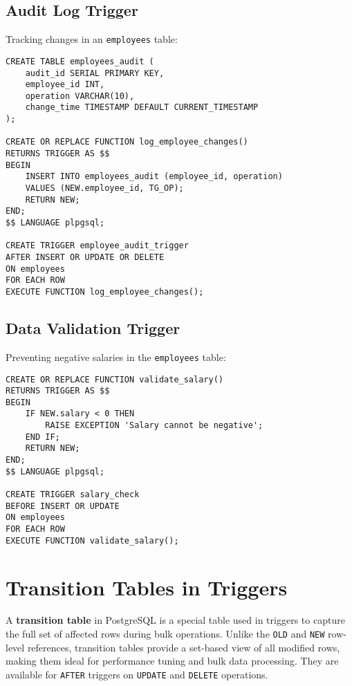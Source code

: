 \documentclass{article}
\begin{document}
\subsection*{Audit Log Trigger}
Tracking changes in an \texttt{employees} table:

\begin{verbatim}
CREATE TABLE employees_audit (
    audit_id SERIAL PRIMARY KEY,
    employee_id INT,
    operation VARCHAR(10),
    change_time TIMESTAMP DEFAULT CURRENT_TIMESTAMP
);

CREATE OR REPLACE FUNCTION log_employee_changes()
RETURNS TRIGGER AS $$
BEGIN
    INSERT INTO employees_audit (employee_id, operation)
    VALUES (NEW.employee_id, TG_OP);
    RETURN NEW;
END;
$$ LANGUAGE plpgsql;

CREATE TRIGGER employee_audit_trigger
AFTER INSERT OR UPDATE OR DELETE
ON employees
FOR EACH ROW
EXECUTE FUNCTION log_employee_changes();
\end{verbatim}

\subsection*{Data Validation Trigger}
Preventing negative salaries in the \texttt{employees} table:

\begin{verbatim}
CREATE OR REPLACE FUNCTION validate_salary()
RETURNS TRIGGER AS $$
BEGIN
    IF NEW.salary < 0 THEN
        RAISE EXCEPTION 'Salary cannot be negative';
    END IF;
    RETURN NEW;
END;
$$ LANGUAGE plpgsql;

CREATE TRIGGER salary_check
BEFORE INSERT OR UPDATE
ON employees
FOR EACH ROW
EXECUTE FUNCTION validate_salary();
\end{verbatim}

\section{Transition Tables in Triggers}

A \textbf{transition table} in PostgreSQL is a special table used in triggers to capture the full set of affected rows during bulk operations. Unlike the \texttt{OLD} and \texttt{NEW} row-level references, transition tables provide a set-based view of all modified rows, making them ideal for performance tuning and bulk data processing. They are available for \texttt{AFTER} triggers on \texttt{UPDATE} and \texttt{DELETE} operations.
\end{document}
